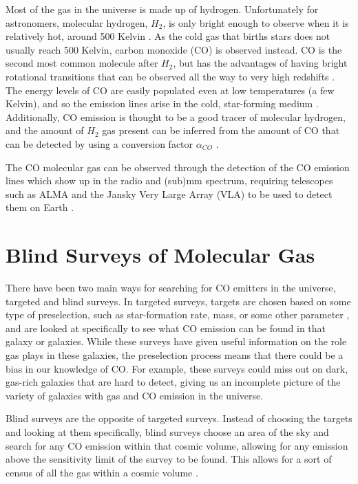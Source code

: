 \documentclass[twoside,single]{lion-msc}
\begin{document}
Most of the gas in the universe is made up of hydrogen. Unfortunately for astronomers, molecular hydrogen, $H_2$, is only bright enough to observe when it is relatively hot, around 500 Kelvin \cite{decarli2019alma}. As the cold gas that births stars does not usually reach 500 Kelvin, carbon monoxide (CO) is observed instead. CO is the second most common molecule after $H_2$, but has the advantages of having bright rotational transitions that can be observed all the way to very high redshifts \cite{carilli2013cool}. The energy levels of CO are easily populated even at low temperatures (a few Kelvin), and so the emission lines arise in the cold, star-forming medium \cite{carilli2013cool}. Additionally, CO emission is thought to be a good tracer of molecular hydrogen, and the amount of $H_2$ gas present can be inferred from the amount of CO that can be detected by using a conversion factor $\alpha_{CO}$ \cite{bolatto2013co}. 

The CO molecular gas can be observed through the detection of the CO emission lines which show up in the radio and (sub)mm spectrum, requiring telescopes such as ALMA and the Jansky Very Large Array (VLA) to be used to detect them on Earth \cite{decarli2019alma}. 

\section{Blind Surveys of Molecular Gas}

There have been two main ways for searching for CO emitters in the universe, targeted and blind surveys. In targeted surveys, targets are chosen based on some type of preselection, such as star-formation rate, mass, or some other parameter \cite{tacconi2018phibss}, and are looked at specifically to see what CO emission can be found in that galaxy or galaxies. While these surveys have given useful information on the role gas plays in these galaxies, the preselection process means that there could be a bias in our knowledge of CO. For example, these surveys could miss out on dark, gas-rich galaxies that are hard to detect, giving us an incomplete picture of the variety of galaxies with gas and CO emission in the universe. 

Blind surveys are the opposite of targeted surveys. Instead of choosing the targets and looking at them specifically, blind surveys choose an area of the sky and search for any CO emission within that cosmic volume, allowing for any emission above the sensitivity limit of the survey to be found. This allows for a sort of census of all the gas within a cosmic volume \cite{decarli2019alma}. 
\end{document}
